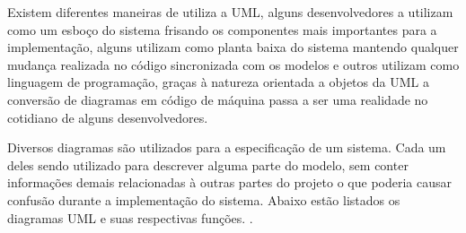 Existem diferentes maneiras de utiliza a UML, alguns desenvolvedores a utilizam como um esboço do sistema frisando os componentes mais importantes para a implementação, alguns utilizam como planta baixa do sistema mantendo qualquer mudança realizada no código sincronizada com os modelos e outros utilizam como linguagem de programação, graças à natureza orientada a objetos da UML a conversão de diagramas em código de máquina passa a ser uma realidade no cotidiano de alguns desenvolvedores. \cite{UML:2006}

Diversos diagramas são utilizados para a especificação de um sistema. Cada um deles sendo utilizado para descrever alguma parte do modelo, sem conter informações demais relacionadas à outras partes do projeto o que poderia causar confusão durante a implementação do sistema. Abaixo estão listados os diagramas UML e suas respectivas funções. \cite{UML:2006}.

